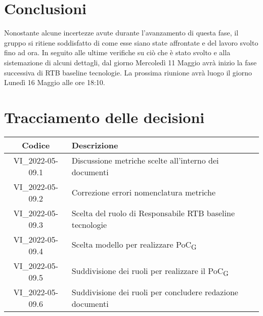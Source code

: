 \section{Conclusioni}
Nonostante alcune incertezze avute durante l'avanzamento di questa fase, il gruppo si ritiene soddisfatto di come esse siano state affrontate e del lavoro svolto fino ad ora. In seguito alle ultime verifiche su ciò che è stato svolto e alla sistemazione di alcuni dettagli, dal giorno Mercoledì 11 Maggio avrà inizio la fase successiva di RTB baseline tecnologie. 
\newline
La prossima riunione avrà luogo il giorno Lunedì 16 Maggio alle ore 18:10. 
\newpage

\section*{Tracciamento delle decisioni}
	\renewcommand{\arraystretch}{1.8} %
	\begin{tabular}{ |c|l| }
		\hline
		\textbf{Codice} & \textbf{Descrizione} \\
		\hline
		VI\_2022-05-09.1 & Discussione metriche scelte all'interno dei documenti\\ %
		\hline
		VI\_2022-05-09.2 & Correzione errori nomenclatura metriche\\ %
		\hline
		VI\_2022-05-09.3 & Scelta del ruolo di Responsabile RTB baseline tecnologie\\ %
		\hline
		VI\_2022-05-09.4 & Scelta modello per realizzare PoC\textsubscript{G}\\ %
		\hline
		VI\_2022-05-09.5 & Suddivisione dei ruoli per realizzare il PoC\textsubscript{G}\\ %
		\hline
		VI\_2022-05-09.6 & Suddivisione dei ruoli per concludere redazione documenti\\ %
		\hline
	\end{tabular}